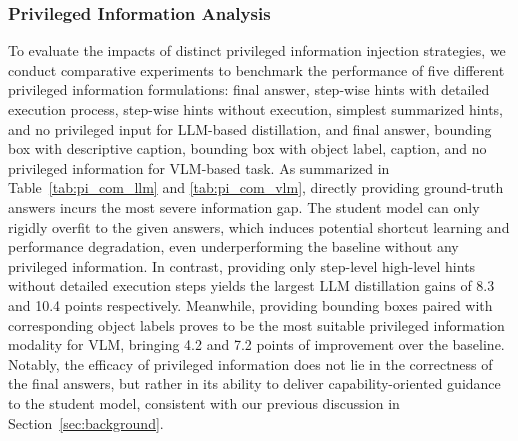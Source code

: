 \documentclass{llmxive}
\begin{document}
\subsubsection{Privileged Information Analysis}
\label{sec:pi_analysis}

To evaluate the impacts of distinct privileged information injection strategies, we conduct comparative experiments to benchmark the performance of five different privileged information formulations: final answer, step-wise hints with detailed execution process, step-wise hints without execution,  simplest summarized hints, and no privileged input for LLM-based distillation, and final answer, bounding box with descriptive caption, bounding box with object label, caption, and no privileged information for VLM-based task.
As summarized in Table~\ref{tab:pi_com_llm} and \ref{tab:pi_com_vlm}, directly providing ground-truth answers incurs the most severe information gap. The student model can only rigidly overfit to the given answers, which induces potential shortcut learning and performance degradation, even underperforming the baseline without any privileged information.
In contrast, providing only step-level high-level hints without detailed execution steps yields the largest LLM distillation gains of 8.3 and 10.4 points respectively. Meanwhile, providing bounding boxes paired with corresponding object labels proves to be the most suitable privileged information modality for VLM, bringing 4.2 and 7.2 points of improvement over the baseline.
Notably, the efficacy of privileged information does not lie in the correctness of the final answers, but rather in its ability to deliver capability-oriented guidance to the student model, consistent with our previous discussion in Section~\ref{sec:background}.
\end{document}
